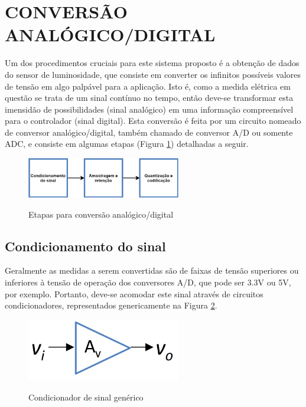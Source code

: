 \documentclass[oneside,openright,12pt]{ufsm_2015} %
\begin{document}
\section{CONVERSÃO ANALÓGICO/DIGITAL}
Um dos procedimentos cruciais para este sistema proposto é a obtenção de dados do sensor de luminosidade, que consiste em converter os infinitos possíveis valores de tensão em algo palpável para a aplicação. Isto é, como a medida elétrica em questão se trata de um sinal contínuo no tempo, então deve-se transformar esta imensidão de possibilidades (sinal analógico) em uma informação compreensível para o controlador (sinal digital). Esta conversão é
feita por um circuito nomeado de conversor analógico/digital, também chamado de conversor A/D ou somente ADC, e consiste em algumas etapas (Figura \ref{fig:etapas-conversor}) detalhadas a seguir.

\begin{figure}[ht]
    \caption{\label{exepretex} Etapas para conversão analógico/digital}
    \centering
    \includegraphics[width=0.6\textwidth]{figuras/conversor.png}
    \vspace{\baselineskip} %
        \label{fig:etapas-conversor}
\end{figure}

\subsection{Condicionamento do sinal}
Geralmente as medidas a serem convertidas são de faixas de tensão superiores ou inferiores à tensão de operação dos conversores A/D, que pode ser 3.3V ou 5V, por exemplo. Portanto, deve-se acomodar este sinal através de circuitos condicionadores, representados genericamente na Figura \ref{fig:condicionador-de-sinal-generico}.

\begin{figure}[ht]
    \caption{\label{exepretex} Condicionador de sinal genérico}
    \centering
    \includegraphics[width=0.6\textwidth]{figuras/condicionador-de-sinal.png}
    \vspace{\baselineskip} %
        \label{fig:condicionador-de-sinal-generico}
\end{figure}
\end{document}
